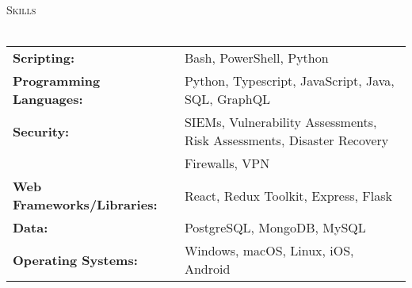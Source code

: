 \documentclass[a4paper]{article}
\newcommand{\lineunder} {
    \vspace*{-8pt} \\
    \hspace*{-18pt} \hrulefill \\
}
\newcommand{\header} [1] {
    {\hspace*{-18pt}\vspace*{5.5pt} \textsc{#1}}
    \vspace*{-6pt} \lineunder
}
\begin{document}
\header{Skills}
\begin{tabular}{ l l }

        
        \textbf{Scripting:}    & Bash, PowerShell, Python \\
        \textbf{Programming Languages:}    & Python, Typescript, JavaScript, Java, SQL, GraphQL \\
        \textbf{Security:}    & SIEMs, Vulnerability Assessments, Risk Assessments, Disaster Recovery \\ 
        & Firewalls, VPN\\
        \textbf{Web Frameworks/Libraries:} & React, Redux Toolkit, Express, Flask \\
        \textbf{Data:} & PostgreSQL, MongoDB, MySQL\\
        \textbf{Operating Systems:} & Windows, macOS, Linux, iOS, Android \\
\end{tabular}
\vspace{-0.5mm} 
\end{document}
